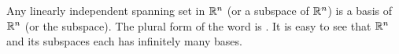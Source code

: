 \documentclass{ximera}
\begin{document}
Any linearly independent spanning set in $\mathbb{R}^n$ (or a subspace of $\mathbb{R}^n$) is a basis of $\mathbb{R}^n$ (or the subspace).  The plural form of the word  is .  It is easy to see that $\mathbb{R}^n$ and its subspaces each has infinitely many bases.
 
\end{document}
